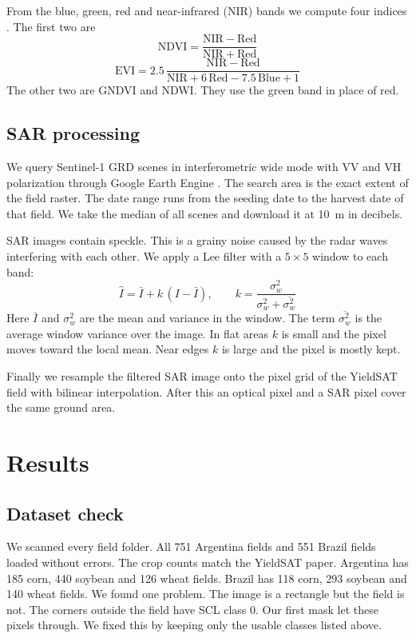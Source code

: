 \documentclass[conference]{IEEEtran}
\begin{document}
From the blue, green, red and near-infrared (NIR) bands we compute four indices \cite{rouse}. The first two are
\begin{equation}
\mathrm{NDVI}=\frac{\mathrm{NIR}-\mathrm{Red}}{\mathrm{NIR}+\mathrm{Red}}
\end{equation}
\begin{equation}
\mathrm{EVI}=2.5\,\frac{\mathrm{NIR}-\mathrm{Red}}{\mathrm{NIR}+6\,\mathrm{Red}-7.5\,\mathrm{Blue}+1}
\end{equation}
The other two are GNDVI and NDWI. They use the green band in place of red.

\subsection{SAR processing}
We query Sentinel-1 GRD scenes in interferometric wide mode with VV and VH polarization \cite{sentinel1} through Google Earth Engine \cite{gee}. The search area is the exact extent of the field raster. The date range runs from the seeding date to the harvest date of that field. We take the median of all scenes and download it at 10~m in decibels.

SAR images contain speckle. This is a grainy noise caused by the radar waves interfering with each other. We apply a Lee filter \cite{lee} with a $5\times5$ window to each band:
\begin{equation}
\hat I=\bar I+k\,(I-\bar I),\qquad k=\frac{\sigma_w^2}{\sigma_w^2+\overline{\sigma_w^2}}
\end{equation}
Here $\bar I$ and $\sigma_w^2$ are the mean and variance in the window. The term $\overline{\sigma_w^2}$ is the average window variance over the image. In flat areas $k$ is small and the pixel moves toward the local mean. Near edges $k$ is large and the pixel is mostly kept.

Finally we resample the filtered SAR image onto the pixel grid of the YieldSAT field with bilinear interpolation. After this an optical pixel and a SAR pixel cover the same ground area.

\section{Results}
\subsection{Dataset check}
We scanned every field folder. All 751 Argentina fields and 551 Brazil fields loaded without errors. The crop counts match the YieldSAT paper. Argentina has 185 corn, 440 soybean and 126 wheat fields. Brazil has 118 corn, 293 soybean and 140 wheat fields. We found one problem. The image is a rectangle but the field is not. The corners outside the field have SCL class 0. Our first mask let these pixels through. We fixed this by keeping only the usable classes listed above.
\end{document}
